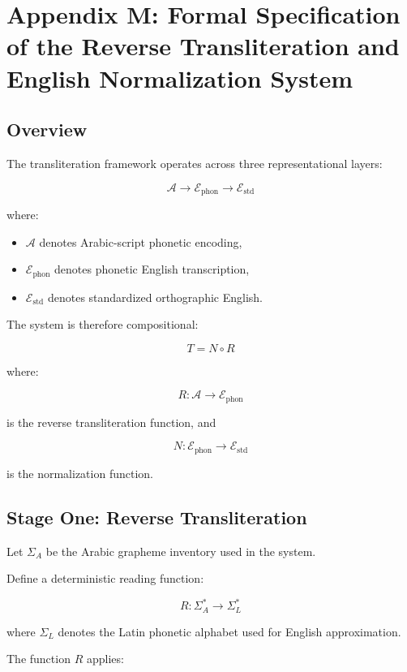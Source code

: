 \documentclass[12pt]{article}
\begin{document}
\section{Appendix M: Formal Specification of the Reverse Transliteration and English Normalization System}

\subsection{Overview}

The transliteration framework operates across three representational layers:

\[
\mathcal{A} \rightarrow \mathcal{E}_{\text{phon}} \rightarrow \mathcal{E}_{\text{std}}
\]

where:

\begin{itemize}
\item $\mathcal{A}$ denotes Arabic-script phonetic encoding,
\item $\mathcal{E}_{\text{phon}}$ denotes phonetic English transcription,
\item $\mathcal{E}_{\text{std}}$ denotes standardized orthographic English.
\end{itemize}

The system is therefore compositional:

\[
T = N \circ R
\]

where:

\[
R : \mathcal{A} \rightarrow \mathcal{E}_{\text{phon}}
\]

is the reverse transliteration function, and

\[
N : \mathcal{E}_{\text{phon}} \rightarrow \mathcal{E}_{\text{std}}
\]

is the normalization function.

\subsection{Stage One: Reverse Transliteration}

Let $\Sigma_A$ be the Arabic grapheme inventory used in the system.

Define a deterministic reading function:

\[
R : \Sigma_A^\ast \rightarrow \Sigma_{L}^\ast
\]

where $\Sigma_{L}$ denotes the Latin phonetic alphabet used for English approximation.

The function $R$ applies:
\end{document}
